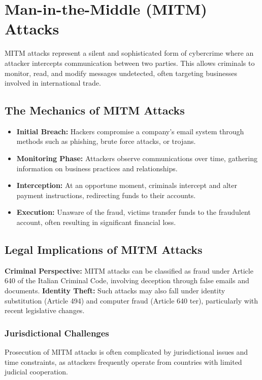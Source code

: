\section{Man-in-the-Middle (MITM) Attacks}
MITM attacks represent a silent and sophisticated form of cybercrime where an attacker intercepts communication between two parties. This allows criminals to monitor, read, and modify messages undetected, often targeting businesses involved in international trade.

\subsection{The Mechanics of MITM Attacks}
\begin{itemize}
    \item \textbf{Initial Breach:} Hackers compromise a company's email system through methods such as phishing, brute force attacks, or trojans.
    \item \textbf{Monitoring Phase:} Attackers observe communications over time, gathering information on business practices and relationships.
    \item \textbf{Interception:} At an opportune moment, criminals intercept and alter payment instructions, redirecting funds to their accounts.
    \item \textbf{Execution:} Unaware of the fraud, victims transfer funds to the fraudulent account, often resulting in significant financial loss.
\end{itemize}

\subsection{Legal Implications of MITM Attacks}
\textbf{Criminal Perspective:} MITM attacks can be classified as fraud under Article 640 of the Italian Criminal Code, involving deception through false emails and documents. \textbf{Identity Theft:} Such attacks may also fall under identity substitution (Article 494) and computer fraud (Article 640 ter), particularly with recent legislative changes.

\subsubsection{Jurisdictional Challenges}
Prosecution of MITM attacks is often complicated by jurisdictional issues and time constraints, as attackers frequently operate from countries with limited judicial cooperation.

